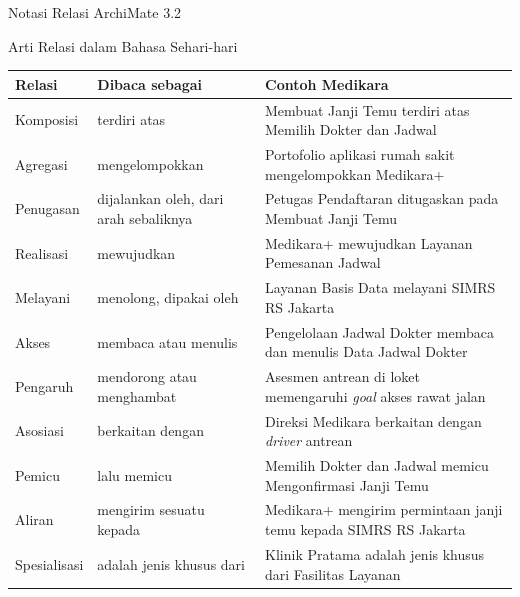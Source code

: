 \documentclass[aspectratio=169, table, 12pt]{beamer}
\begin{document}
\begin{frame}{{\Large Notasi Relasi ArchiMate 3.2}}
  \centering
\end{frame}

\begin{frame}{{\Large Arti Relasi dalam Bahasa Sehari-hari}}
  \scriptsize
  \begin{tabularx}{\textwidth}{>{\raggedright\arraybackslash}p{1.8cm}
      >{\raggedright\arraybackslash}p{3.8cm} >{\raggedright\arraybackslash}X}
    \hline
    \textbf{Relasi} & \textbf{Dibaca sebagai} & \textbf{Contoh Medikara} \\
    \hline
    Komposisi & terdiri atas & Membuat Janji Temu terdiri atas Memilih Dokter dan Jadwal \\
    \hline
    Agregasi & mengelompokkan & Portofolio aplikasi rumah sakit mengelompokkan Medikara+ \\
    \hline
    Penugasan & dijalankan oleh, dari arah sebaliknya & Petugas Pendaftaran ditugaskan pada Membuat Janji Temu \\
    \hline
    Realisasi & mewujudkan & Medikara+ mewujudkan Layanan Pemesanan Jadwal \\
    \hline
    Melayani & menolong, dipakai oleh & Layanan Basis Data melayani SIMRS RS Jakarta \\
    \hline
    Akses & membaca atau menulis & Pengelolaan Jadwal Dokter membaca dan menulis Data Jadwal Dokter \\
    \hline
    Pengaruh & mendorong atau menghambat & Asesmen antrean di loket memengaruhi \textit{goal} akses rawat jalan \\
    \hline
    Asosiasi & berkaitan dengan & Direksi Medikara berkaitan dengan \textit{driver} antrean \\
    \hline
    Pemicu & lalu memicu & Memilih Dokter dan Jadwal memicu Mengonfirmasi Janji Temu \\
    \hline
    Aliran & mengirim sesuatu kepada & Medikara+ mengirim permintaan janji temu kepada SIMRS RS Jakarta \\
    \hline
    Spesialisasi & adalah jenis khusus dari & Klinik Pratama adalah jenis khusus dari Fasilitas Layanan \\
    \hline
  \end{tabularx}
\end{frame}
\end{document}
